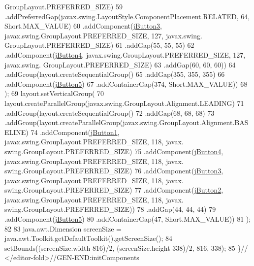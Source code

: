 \begin{DoxyCode}
      GroupLayout.PREFERRED\_SIZE)
59                 .addPreferredGap(javax.swing.LayoutStyle.ComponentPlacement.RELATED, 64, Short.MAX\_VALUE)
60                 .addComponent(\mbox{\hyperlink{class_r_m_i_1_1_colores_a2ca1cf1514d7f93a94808c3c4d8f19e7}{jButton3}}, javax.swing.GroupLayout.PREFERRED\_SIZE, 127, javax.swing.
      GroupLayout.PREFERRED\_SIZE)
61                 .addGap(55, 55, 55)
62                 .addComponent(\mbox{\hyperlink{class_r_m_i_1_1_colores_a07351e661898a4b3c4a1b0abae7fcbb5}{jButton4}}, javax.swing.GroupLayout.PREFERRED\_SIZE, 127, javax.swing.
      GroupLayout.PREFERRED\_SIZE)
63                 .addGap(60, 60, 60))
64             .addGroup(layout.createSequentialGroup()
65                 .addGap(355, 355, 355)
66                 .addComponent(\mbox{\hyperlink{class_r_m_i_1_1_colores_a20b401d6acdf13f51e984d95c4697d90}{jButton5}})
67                 .addContainerGap(374, Short.MAX\_VALUE))
68         );
69         layout.setVerticalGroup(
70             layout.createParallelGroup(javax.swing.GroupLayout.Alignment.LEADING)
71             .addGroup(layout.createSequentialGroup()
72                 .addGap(68, 68, 68)
73                 .addGroup(layout.createParallelGroup(javax.swing.GroupLayout.Alignment.BASELINE)
74                     .addComponent(\mbox{\hyperlink{class_r_m_i_1_1_colores_add77873c88866ea978fcad21ad2eda75}{jButton1}}, javax.swing.GroupLayout.PREFERRED\_SIZE, 118, javax.
      swing.GroupLayout.PREFERRED\_SIZE)
75                     .addComponent(\mbox{\hyperlink{class_r_m_i_1_1_colores_a07351e661898a4b3c4a1b0abae7fcbb5}{jButton4}}, javax.swing.GroupLayout.PREFERRED\_SIZE, 118, javax.
      swing.GroupLayout.PREFERRED\_SIZE)
76                     .addComponent(\mbox{\hyperlink{class_r_m_i_1_1_colores_a2ca1cf1514d7f93a94808c3c4d8f19e7}{jButton3}}, javax.swing.GroupLayout.PREFERRED\_SIZE, 118, javax.
      swing.GroupLayout.PREFERRED\_SIZE)
77                     .addComponent(\mbox{\hyperlink{class_r_m_i_1_1_colores_ad8deec15488def53e7a4e617ae4253ad}{jButton2}}, javax.swing.GroupLayout.PREFERRED\_SIZE, 118, javax.
      swing.GroupLayout.PREFERRED\_SIZE))
78                 .addGap(44, 44, 44)
79                 .addComponent(\mbox{\hyperlink{class_r_m_i_1_1_colores_a20b401d6acdf13f51e984d95c4697d90}{jButton5}})
80                 .addContainerGap(47, Short.MAX\_VALUE))
81         );
82 
83         java.awt.Dimension screenSize = java.awt.Toolkit.getDefaultToolkit().getScreenSize();
84         setBounds((screenSize.width-816)/2, (screenSize.height-338)/2, 816, 338);
85     \}\textcolor{comment}{// </editor-fold>//GEN-END:initComponents}
\end{DoxyCode}
\mbox{\label{class_r_m_i_1_1_colores_a9f457076530e2ee7660ccd9b4c9a1898}} 
